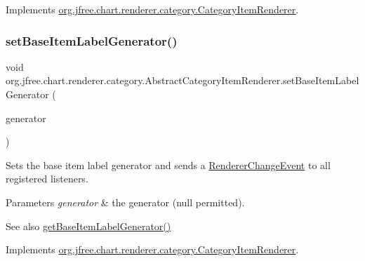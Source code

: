 Implements \mbox{\hyperlink{interfaceorg_1_1jfree_1_1chart_1_1renderer_1_1category_1_1_category_item_renderer_a35bcf49a6299b954e2215030f68ec59b}{org.\+jfree.\+chart.\+renderer.\+category.\+Category\+Item\+Renderer}}.

\mbox{\label{classorg_1_1jfree_1_1chart_1_1renderer_1_1category_1_1_abstract_category_item_renderer_a3752262b1c62f959e47ba3542e1e7149}} 
\subsubsection{\texorpdfstring{set\+Base\+Item\+Label\+Generator()}{setBaseItemLabelGenerator()}}
{\footnotesize\ttfamily void org.\+jfree.\+chart.\+renderer.\+category.\+Abstract\+Category\+Item\+Renderer.\+set\+Base\+Item\+Label\+Generator (\begin{DoxyParamCaption}\item[{\mbox{\hyperlink{interfaceorg_1_1jfree_1_1chart_1_1labels_1_1_category_item_label_generator}{Category\+Item\+Label\+Generator}}}]{generator }\end{DoxyParamCaption})}

Sets the base item label generator and sends a \mbox{\hyperlink{}{Renderer\+Change\+Event}} to all registered listeners.


\begin{DoxyParams}{Parameters}
{\em generator} & the generator ({\ttfamily null} permitted).\\
\hline
\end{DoxyParams}
\begin{DoxySeeAlso}{See also}
\mbox{\hyperlink{classorg_1_1jfree_1_1chart_1_1renderer_1_1category_1_1_abstract_category_item_renderer_a8cb1f3366a62871739928e4b5c75ade5}{get\+Base\+Item\+Label\+Generator()}} 
\end{DoxySeeAlso}


Implements \mbox{\hyperlink{interfaceorg_1_1jfree_1_1chart_1_1renderer_1_1category_1_1_category_item_renderer_aa4ca7bd2b2d702c879718fece021d3a4}{org.\+jfree.\+chart.\+renderer.\+category.\+Category\+Item\+Renderer}}.

